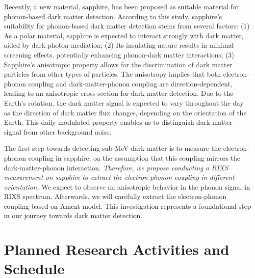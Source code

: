 \documentclass[11pt]{article}
\begin{document}
Recently, a new material, sapphire, has been proposed as suitable material for phonon-based dark matter detection\cite{griffin_directional_2018}. According to this study, sapphire's suitability for phonon-based dark matter detection stems from several factors: (1) As a polar material, sapphire is  expected to interact strongly with dark matter, aided by dark photon mediation; (2) Its insulating nature results in minimal screening effects, potentially enhancing phonon-dark matter interactions; (3) Sapphire's anisotropic property allows for the discrimination of dark matter particles from other types of particles. The anisotropy implies that both electron-phonon coupling and dark-matter-phonon coupling are direction-dependent\cite{griffin_directional_2018}, leading to an anisotropic cross section for dark matter detection. Due to the Earth's rotation, the dark matter signal is expected to vary throughout the day as the direction of dark matter flux changes, depending on the orientation of the Earth. This daily-modulated property enables us to distinguish dark matter signal from other background noise.

The first step towards detecting sub-MeV dark matter is to measure the electron-phonon coupling in sapphire, on the assumption that this coupling mirrors the dark-matter-phonon interaction. \textit{Therefore, we propose conducting a RIXS measurement on sapphire to extract the electron-phonon coupling in different orientation.}  We expect to observe an anisotropic behavior in the phonon signal in RIXS spectrum. Afterwards, we will carefully extract the electron-phonon coupling based on Ament model\cite{ament_determining_2011}. This investigation represents a foundational step in our journey towards dark matter detection.


\section{Planned Research Activities and Schedule}
\end{document}

